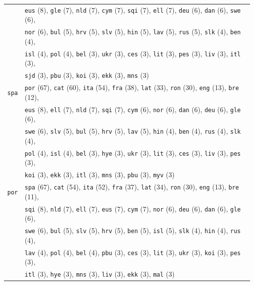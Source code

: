 \begin{center}
\begin{longtable}{ll}
 & \texttt{eus} (8), \texttt{gle} (7), \texttt{nld} (7), \texttt{cym} (7), \texttt{sqi} (7), \texttt{ell} (7), \texttt{deu} (6), \texttt{dan} (6), \texttt{swe} (6),\\
 & \texttt{nor} (6), \texttt{bul} (5), \texttt{hrv} (5), \texttt{slv} (5), \texttt{hin} (5), \texttt{lav} (5), \texttt{rus} (5), \texttt{slk} (4), \texttt{ben} (4),\\
 & \texttt{isl} (4), \texttt{pol} (4), \texttt{bel} (3), \texttt{ukr} (3), \texttt{ces} (3), \texttt{lit} (3), \texttt{pes} (3), \texttt{liv} (3), \texttt{itl} (3),\\
 & \texttt{sjd} (3), \texttt{pbu} (3), \texttt{koi} (3), \texttt{ekk} (3), \texttt{mns} (3) \\
\texttt{spa} & \texttt{por} (67), \texttt{cat} (60), \texttt{ita} (54), \texttt{fra} (38), \texttt{lat} (33), \texttt{ron} (30), \texttt{eng} (13), \texttt{bre} (12),\\
 & \texttt{eus} (8), \texttt{ell} (7), \texttt{nld} (7), \texttt{sqi} (7), \texttt{cym} (6), \texttt{nor} (6), \texttt{dan} (6), \texttt{deu} (6), \texttt{gle} (6),\\
 & \texttt{swe} (6), \texttt{slv} (5), \texttt{bul} (5), \texttt{hrv} (5), \texttt{lav} (5), \texttt{hin} (4), \texttt{ben} (4), \texttt{rus} (4), \texttt{slk} (4),\\
 & \texttt{pol} (4), \texttt{isl} (4), \texttt{bel} (3), \texttt{hye} (3), \texttt{ukr} (3), \texttt{lit} (3), \texttt{ces} (3), \texttt{liv} (3), \texttt{pes} (3),\\
 & \texttt{koi} (3), \texttt{ekk} (3), \texttt{itl} (3), \texttt{mns} (3), \texttt{pbu} (3), \texttt{myv} (3) \\
\texttt{por} & \texttt{spa} (67), \texttt{cat} (54), \texttt{ita} (52), \texttt{fra} (37), \texttt{lat} (34), \texttt{ron} (30), \texttt{eng} (13), \texttt{bre} (11),\\
 & \texttt{sqi} (8), \texttt{nld} (7), \texttt{ell} (7), \texttt{eus} (7), \texttt{cym} (7), \texttt{nor} (6), \texttt{deu} (6), \texttt{dan} (6), \texttt{gle} (6),\\
 & \texttt{swe} (6), \texttt{bul} (5), \texttt{slv} (5), \texttt{hrv} (5), \texttt{ben} (5), \texttt{isl} (5), \texttt{slk} (4), \texttt{hin} (4), \texttt{rus} (4),\\
 & \texttt{lav} (4), \texttt{pol} (4), \texttt{bel} (4), \texttt{pbu} (3), \texttt{ces} (3), \texttt{lit} (3), \texttt{ukr} (3), \texttt{koi} (3), \texttt{pes} (3),\\
 & \texttt{itl} (3), \texttt{hye} (3), \texttt{mns} (3), \texttt{liv} (3), \texttt{ekk} (3), \texttt{mal} (3) \\

\end{longtable}
\end{center}
